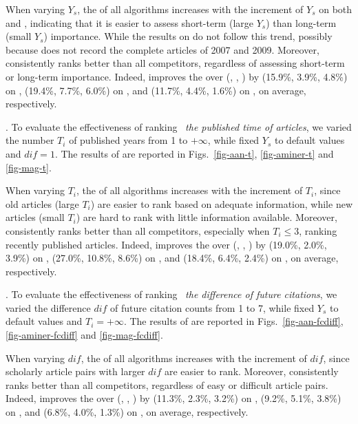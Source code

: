 When varying $Y_s$, the \PairAcc of all algorithms increases with the increment of $Y_s$ on both \aminer and \magdata, indicating that it is easier to assess short-term (large $Y_s$) than long-term (small $Y_s$) importance. While the results on \aan do not follow this trend, possibly because \aan does not record the complete articles of 2007 and 2009.
Moreover, \ensemblerank consistently ranks better than all competitors, regardless of assessing short-term or long-term importance.
Indeed, \ensemblerank improves the \PairAcc over (\pagerank, \futurerank, \hhgrank) by (15.9\%, 3.9\%, 4.8\%) on \aan, (19.4\%, 7.7\%, 6.0\%) on \aminer, and  (11.7\%, 4.4\%, 1.6\%) on \magdata, on average, respectively.



.
To evaluate the effectiveness of ranking \wrt\ {\em the published time of articles},
we varied the number $T_i$ of published years from 1 to $+\infty$, while fixed $Y_s$ to default values and $dif=1$. The results of \PairAcc are reported in Figs.~\ref{fig-aan-t}, \ref{fig-aminer-t} and \ref{fig-mag-t}.


When varying $T_i$, the \PairAcc of all algorithms increases with the increment of $T_i$, since old articles (large $T_i$) are easier to rank based on adequate information, while new articles (small $T_i$) are hard to rank with little information available. Moreover, \ensemblerank consistently ranks better than all competitors, especially when $T_i\le3$, \ie ranking recently published articles. Indeed, \ensemblerank improves the \PairAcc over (\pagerank, \futurerank, \hhgrank) by (19.0\%, 2.0\%, 3.9\%) on \aan, (27.0\%, 10.8\%, 8.6\%) on \aminer, and (18.4\%, 6.4\%, 2.4\%) on \magdata, on average, respectively.


.
To evaluate the effectiveness of ranking \wrt\ {\em the difference of future citations},
we varied the difference $dif$ of future citation counts from 1 to 7, while fixed $Y_s$ to default values and $T_i=+\infty$. The results of \PairAcc are reported in Figs.~\ref{fig-aan-fcdiff}, \ref{fig-aminer-fcdiff} and \ref{fig-mag-fcdiff}.

When varying $dif$, the \PairAcc of all algorithms increases with the increment of $dif$, since scholarly article pairs with larger $dif$ are easier to rank. Moreover, \ensemblerank consistently ranks better than all competitors, regardless of easy or difficult article pairs. Indeed, \ensemblerank improves the \PairAcc over (\pagerank, \futurerank, \hhgrank) by (11.3\%, 2.3\%, 3.2\%) on \aan, (9.2\%, 5.1\%, 3.8\%) on \aminer, and (6.8\%, 4.0\%, 1.3\%) on \magdata, on average, respectively.

